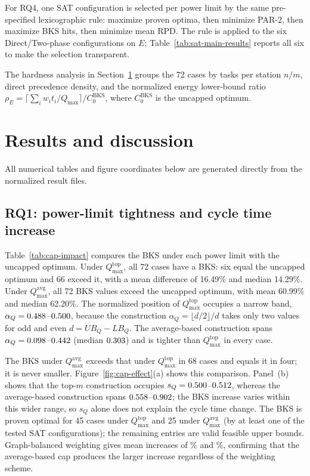\documentclass[]{interact}
\theoremstyle{plain}
\theoremstyle{definition}
\theoremstyle{remark}
\newcommand{\Qmax}{Q_{\max}}
\begin{document}
For RQ4, one SAT configuration is selected per power limit by the same pre-specified lexicographic rule: maximize proven optima, then minimize PAR-2, then maximize BKS hits, then minimize mean RPD. The rule is applied to the six Direct/Two-phase configurations on $E$; Table~\ref{tab:sat-main-results} reports all six to make the selection transparent.

The hardness analysis in Section~\ref{sec:results} groups the 72 cases by tasks per station $n/m$, direct precedence density, and the normalized energy lower-bound ratio $\rho_E=\lceil\sum_iw_it_i/\Qmax\rceil/C^{\mathrm{BKS}}_0$, where $C^{\mathrm{BKS}}_0$ is the uncapped optimum.

\section{Results and discussion}
\label{sec:results}

All numerical tables and figure coordinates below are generated directly from the normalized result files.

\subsection{RQ1: power-limit tightness and cycle time increase}

Table~\ref{tab:cap-impact} compares the BKS under each power limit with the uncapped optimum. Under $Q_{\max}^{\mathrm{top}}$, all 72 cases have a BKS: six equal the uncapped optimum and 66 exceed it, with a mean difference of 16.49\% and median 14.29\%. Under $Q_{\max}^{\mathrm{avg}}$, all 72 BKS values exceed the uncapped optimum, with mean 60.99\% and median 62.20\%. The normalized position of $Q_{\max}^{\mathrm{top}}$ occupies a narrow band, $\alpha_Q=0.488$--$0.500$, because the construction $\alpha_Q=\lfloor d/2\rfloor/d$ takes only two values for odd and even $d=UB_Q-LB_Q$. The average-based construction spans $\alpha_Q=0.098$--$0.442$ (median $0.303$) and is tighter than $Q_{\max}^{\mathrm{top}}$ in every case.

The BKS under $Q_{\max}^{\mathrm{avg}}$ exceeds that under $Q_{\max}^{\mathrm{top}}$ in 68 cases and equals it in four; it is never smaller. Figure~\ref{fig:cap-effect}(a) shows this comparison. Panel~(b) shows that the top-$m$ construction occupies $s_Q=0.500$--$0.512$, whereas the average-based construction spans $0.558$--$0.902$; the BKS increase varies within this wider range, so $s_Q$ alone does not explain the cycle time change. The BKS is proven optimal for 45 cases under $Q_{\max}^{\mathrm{top}}$ and 25 under $Q_{\max}^{\mathrm{avg}}$ (by at least one of the tested SAT configurations); the remaining entries are valid feasible upper bounds. Graph-balanced weighting gives mean increases of \GraphBalancedTopPenaltyPct\% and \GraphBalancedAVGPenaltyPct\%, confirming that the average-based cap produces the larger increase regardless of the weighting scheme.
\end{document}
